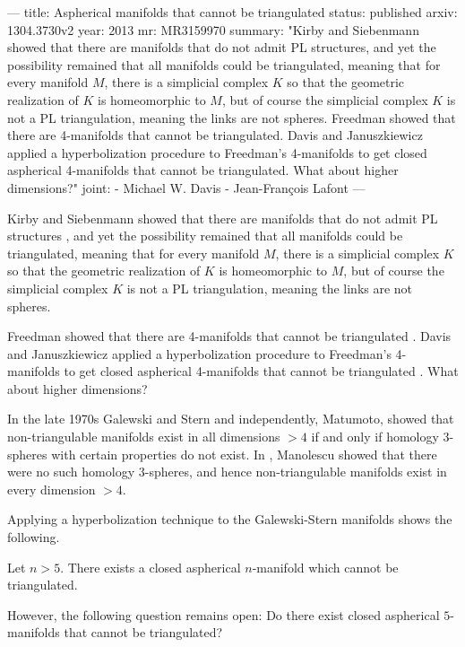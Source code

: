 ---
title: Aspherical manifolds that cannot be triangulated
status: published
arxiv: 1304.3730v2
year: 2013
mr: MR3159970
summary: "Kirby and Siebenmann showed that there are manifolds that do not admit PL structures, and yet the possibility remained that all manifolds could be triangulated, meaning that for every manifold $M$, there is a simplicial complex $K$ so that the geometric realization of $K$ is homeomorphic to $M$, but of course the simplicial complex $K$ is not a PL triangulation, meaning the links are not spheres.  Freedman showed that there are 4-manifolds that cannot be triangulated.  Davis and Januszkiewicz applied a hyperbolization procedure to Freedman's 4-manifolds to get closed aspherical 4-manifolds that cannot be triangulated.  What about higher dimensions?"
joint:
 - Michael W. Davis
 - Jean-François Lafont
---

Kirby and Siebenmann showed that there are manifolds that do not admit PL structures \cite{MR242166}, and yet the possibility remained that all manifolds could be triangulated, meaning that for every manifold $M$, there is a simplicial complex $K$ so that the geometric realization of $K$ is homeomorphic to $M$, but of course the simplicial complex $K$ is not a PL triangulation, meaning the links are not spheres.

Freedman showed that there are 4-manifolds that cannot be triangulated \cite{MR679066}.  Davis and Januszkiewicz applied a hyperbolization procedure to Freedman's 4-manifolds to get closed aspherical 4-manifolds that cannot be triangulated \cite{MR1131435}.  What about higher dimensions?

In the late 1970s Galewski and Stern \cite{MR558395} and independently, Matumoto, showed that non-triangulable manifolds exist in all dimensions $> 4$ if and only if homology $3$-spheres with certain properties do not exist. In \cite{MR3122335}, Manolescu showed that there were no such homology $3$-spheres, and hence non-triangulable manifolds exist in every dimension $>4$.

Applying a hyperbolization technique to the Galewski-Stern manifolds shows the following.
\begin{theorem}
  Let $n > 5$.  There exists a closed aspherical $n$-manifold which
  cannot be triangulated.
\end{theorem}
However, the following question remains open: Do there exist closed aspherical $5$-manifolds that cannot be triangulated?
